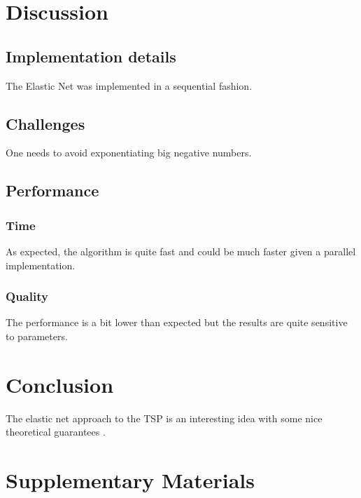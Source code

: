\documentclass{article} %
\begin{document}
\newpage
\section{Discussion}
\label{discussion}


\subsection{Implementation details}

The Elastic Net was implemented in a sequential fashion.


\subsection{Challenges}

One needs to avoid exponentiating big negative numbers.


\subsection{Performance}


\subsubsection{Time}

As expected, the algorithm is quite fast and could be much faster given a parallel implementation.


\subsubsection{Quality}

The performance is a bit lower than expected but the results are quite sensitive to parameters.





\section{Conclusion}
\label{conclusion}

The elastic net approach to the TSP is an interesting idea with some nice theoretical guarantees \citep{en_theoretical_analysis}. 







\newpage
\section{Supplementary Materials}
\end{document}
